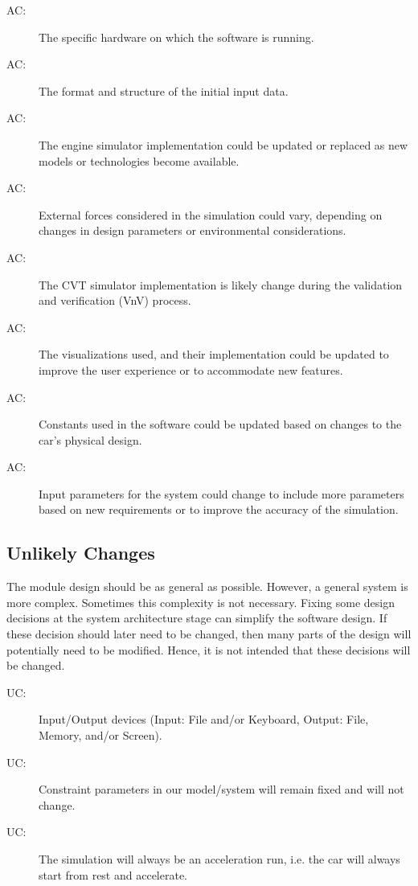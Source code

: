 \documentclass[12pt, titlepage]{article}
\newcounter{acnum}
\newcommand{\actheacnum}{AC\theacnum}
\newcounter{ucnum}
\newcommand{\uctheucnum}{UC\theucnum}
\begin{document}
\begin{description}
  \item[ \actheacnum \label{acHardware}:] The specific hardware on which the software is running.
  \item[ \actheacnum \label{acInput}:] The format and structure of the initial input data.
  \item[ \actheacnum \label{acEngineSimulator}:] The engine simulator implementation could be updated or replaced as new models or technologies become available.
  \item[ \actheacnum \label{acExternalForces}:] External forces considered in the simulation could vary, depending on changes in design parameters or environmental considerations.
  \item[ \actheacnum \label{acCVTSimulator}:] The CVT simulator implementation is likely change during the validation and verification (VnV) process.
  \item[ \actheacnum \label{acVisualizations}:] The visualizations used, and their implementation could be updated to improve the user experience or to accommodate new features.
  \item[ \actheacnum \label{acConstants}:] Constants used in the software could be updated based on changes to the car's physical design.
  \item[ \actheacnum \label{acInputParameters}:] Input parameters for the system could change to include more parameters based on new requirements or to improve the accuracy of the simulation.
  \end{description}

\subsection{Unlikely Changes} \label{SecUchange}

The module design should be as general as possible. However, a general system is
more complex. Sometimes this complexity is not necessary. Fixing some design
decisions at the system architecture stage can simplify the software design. If
these decision should later need to be changed, then many parts of the design
will potentially need to be modified. Hence, it is not intended that these
decisions will be changed.

\begin{description}
  \item[ \uctheucnum \label{ucIO}:] Input/Output devices (Input: File and/or Keyboard, Output: File, Memory, and/or Screen).
  \item[ \uctheucnum \label{ucConstraints}:] Constraint parameters in our model/system will remain fixed and will not change.
  \item[ \uctheucnum \label{ucExcelRun}:] The simulation will always be an acceleration run, i.e. the car will always start from rest and accelerate.
\end{description}
\end{document}

